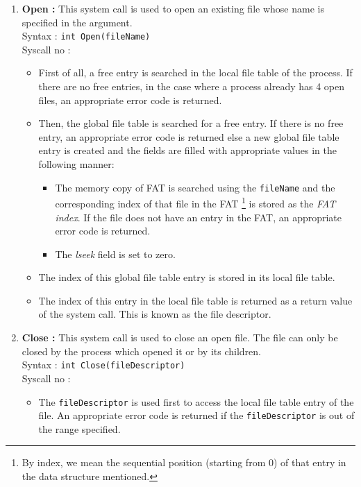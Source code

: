 \begin{enumerate}
	\item \textbf{Open :} This system call is used to open an existing file whose name is specified in the argument.\\
	Syntax : \texttt{int Open(fileName)} \\
	Syscall no :  
	\begin{itemize}
		\item  First of all, a free entry is searched in the local file table of the process. If there are no free entries, in the case where a process already has 4 open files, an appropriate error code is returned.
		
		\item Then, the global file table is searched for a free entry. If there is no free entry, an appropriate error code is returned else a new global file table entry is created and the fields are filled with appropriate values in the following manner:
		\begin{itemize}
			\item The memory copy of FAT  is searched using the \texttt{fileName} and the corresponding index of that file in the FAT \footnote{By index, we mean the sequential position (starting from 0) of that entry in the data structure mentioned.} is stored as the \emph{FAT index}. If the file does not have an entry in the FAT, an appropriate error code is returned.
			
			\item The \emph{lseek} field is set to zero.
		\end{itemize}
		
		\item The index of this global file table entry is stored in its local file table.
		
		\item The index of this entry in the local file table is returned as a return value of the system call. This is known as the file descriptor.
	\end{itemize}

	\item  \textbf{Close :} This system call is used to close an open file. The file can only be closed by the process which opened it or by its children. \\
	Syntax : \texttt{int Close(fileDescriptor) } \\
	Syscall no : 
	\begin{itemize}
		\item The \texttt{fileDescriptor} is used first to access the local file table entry of the file. An appropriate error code is returned if the \texttt{fileDescriptor} is out of the range specified.
		

\end{itemize}
\end{enumerate}
